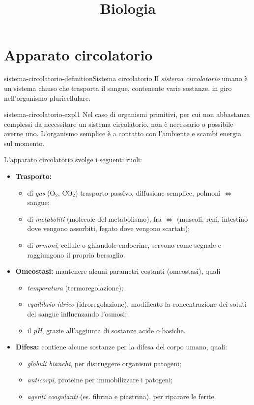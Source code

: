 \documentclass[preview]{standalone}
\begin{document}
\title{Biologia}
\genpage

\section{Apparato circolatorio}

\begin{snippetdefinition}{sistema-circolatorio-definition}{Sistema circolatorio}
    Il \textit{sistema circolatorio} umano è un sistema chiuso
    che trasporta il sangue, contenente varie sostanze, in giro nell'organismo pluricellulare.
\end{snippetdefinition}

\begin{snippet}{sistema-circolatorio-expl1}
    Nel caso di organismi primitivi, per cui non abbastanza complessi da necessitare un sistema circolatorio,
    non è necessario o possibile averne uno.
    L'organismo semplice è a contatto con l'ambiente e scambi energia sul momento.

    L'apparato circolatorio svolge i seguenti ruoli:
    \begin{itemize}
        \item \textbf{Trasporto:} 
        \begin{itemize}
            \item di \textit{gas} (O\({}_2\), CO\({}_2\)) trasporto passivo, diffusione semplice, polmoni \(\iff\) sangue;
            \item di \textit{metaboliti} (molecole del metabolismo), fra \(\iff\) (muscoli, reni, intestino dove vengono assorbiti, fegato dove vengono scartati);
            \item di \textit{ormoni}, cellule o ghiandole endocrine, servono come segnale e raggiungono il proprio bersaglio. %
        \end{itemize}
        \item \textbf{Omeostasi:} mantenere alcuni parametri costanti (omeostasi), quali
            \begin{itemize}
                \item \textit{temperatura} (termoregolazione);
                \item \textit{equilibrio idrico} (idroregolazione), modificato la concentrazione dei soluti del sangue influenzando l'osmosi;
                \item il \textit{pH}, grazie all'aggiunta di sostanze acide o basiche.
            \end{itemize}
        \item \textbf{Difesa:} contiene alcune sostanze per la difesa del corpo umano, quali:
            \begin{itemize}
                \item \textit{globuli bianchi}, per distruggere organismi patogeni;
                \item \textit{anticorpi}, proteine per immobilizzare i patogeni;
                \item \textit{agenti coagulanti} (es. fibrina e piastrina), per riparare le ferite.
            \end{itemize}
    \end{itemize}


\end{snippet}
\end{document}
